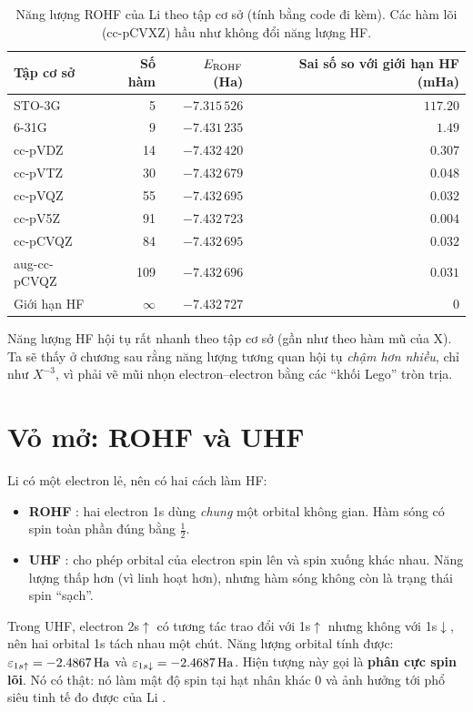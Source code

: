 \begin{table}[h]
\centering\small
\caption{Năng lượng ROHF của Li theo tập cơ sở (tính bằng code đi kèm). Các hàm lõi (cc-pCVXZ) hầu như không đổi năng lượng HF.}
\label{tab:hfcoso}
\begin{tabular}{@{}lrrr@{}}
\toprule
Tập cơ sở & Số hàm & $E_{\rm ROHF}$ (Ha) & Sai số so với giới hạn HF (mHa) \\
\midrule
STO-3G & 5 & $-7.315\,526$ & $117.20$ \\
6-31G & 9 & $-7.431\,235$ & $1.49$ \\
cc-pVDZ & 14 & $-7.432\,420$ & $0.307$ \\
cc-pVTZ & 30 & $-7.432\,679$ & $0.048$ \\
cc-pVQZ & 55 & $-7.432\,695$ & $0.032$ \\
cc-pV5Z & 91 & $-7.432\,723$ & $0.004$ \\
cc-pCVQZ & 84 & $-7.432\,695$ & $0.032$ \\
aug-cc-pCVQZ & 109 & $-7.432\,696$ & $0.031$ \\
\midrule
Giới hạn HF \cite{KogaThakkar1996} & $\infty$ & $-7.432\,727$ & 0 \\
\bottomrule
\end{tabular}
\end{table}

Năng lượng HF hội tụ rất nhanh theo tập cơ sở (gần như theo hàm mũ của X). Ta sẽ thấy ở chương sau rằng năng lượng tương quan hội tụ \emph{chậm hơn nhiều}, chỉ như $X^{-3}$, vì phải vẽ mũi nhọn electron--electron bằng các ``khối Lego'' tròn trịa.

\section{Vỏ mở: ROHF và UHF}

Li có một electron lẻ, nên có hai cách làm HF:
\begin{itemize}
\item \textbf{ROHF} : hai electron 1s dùng \emph{chung} một orbital không gian. Hàm sóng có spin toàn phần đúng bằng $\tfrac12$.
\item \textbf{UHF} : cho phép orbital của electron spin lên và spin xuống khác nhau. Năng lượng thấp hơn (vì linh hoạt hơn), nhưng hàm sóng không còn là trạng thái spin ``sạch''.
\end{itemize}

Trong UHF, electron 2s$\uparrow$ có tương tác trao đổi với 1s$\uparrow$ nhưng không với 1s$\downarrow$, nên hai orbital 1s tách nhau một chút. Năng lượng orbital tính được: $\varepsilon_{1s\uparrow}=-2.4867\,\mathrm{Ha}$ và $\varepsilon_{1s\downarrow}=-2.4687\,\mathrm{Ha}$. Hiện tượng này gọi là \textbf{phân cực spin lõi}. Nó có thật: nó làm mật độ spin tại hạt nhân khác 0 và ảnh hưởng tới phổ siêu tinh tế đo được của Li \cite{Sachs1960}.

